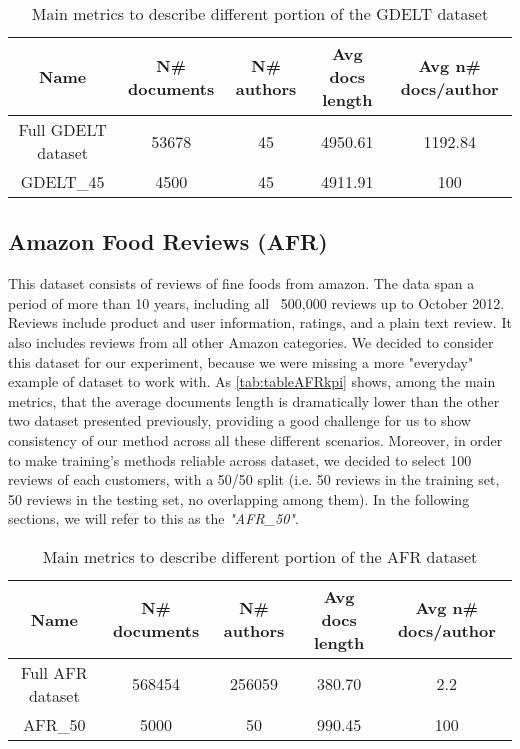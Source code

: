 \begin{table}[h!]
	\begin{center}  
		\caption[GDELT Corpus]{Main metrics to describe different portion of the GDELT dataset} 
		\label{tab:tableGDELTkpi}
		\begin{tabular}{|c | c | c | c | c |}
			\hline 
			Name & N\# documents & N\# authors & Avg docs length & Avg n\# docs/author \\
			\hline
			Full GDELT dataset & 53678 & 45 & 4950.61 & 1192.84 \\ \hline
			GDELT\_45 & 4500 & 45 & 4911.91 & 100  \\ \hline
		\end{tabular} 
	\end{center}
\end{table}

\subsection{Amazon Food Reviews (AFR)}
This dataset consists of reviews of fine foods from amazon. The data span a period of more than 10 years, including all ~500,000 reviews up to October 2012. Reviews include product and user information, ratings, and a plain text review. It also includes reviews from all other Amazon categories.
We decided to consider this dataset for our experiment, because we were missing a more "everyday" example of dataset to work with. As \autoref{tab:tableAFRkpi} shows, among the main metrics, that the average documents length is dramatically lower than the other two dataset presented previously, providing a good challenge for us to show consistency of our method across all these different scenarios.
Moreover, in order to make training's methods reliable across dataset, we decided to select 100 reviews of each customers, with a 50/50 split (i.e. 50 reviews in the training set, 50 reviews in the testing set, no overlapping among them). In the following sections, we will refer to this as the \textit{"AFR\_50"}.

\begin{table}[h!]
	\begin{center}  
		\caption[AFR Corpus]{Main metrics to describe different portion of the AFR dataset} 
		\label{tab:tableAFRkpi}
		\begin{tabular}{|c | c | c | c | c |}
			\hline 
			Name & N\# documents & N\# authors & Avg docs length & Avg n\# docs/author \\
			\hline
			Full AFR dataset & 568454 & 256059 & 380.70 & 2.2 \\ \hline
			AFR\_50 & 5000 & 50 & 990.45 & 100  \\ \hline
		\end{tabular} 
	\end{center}
\end{table}

